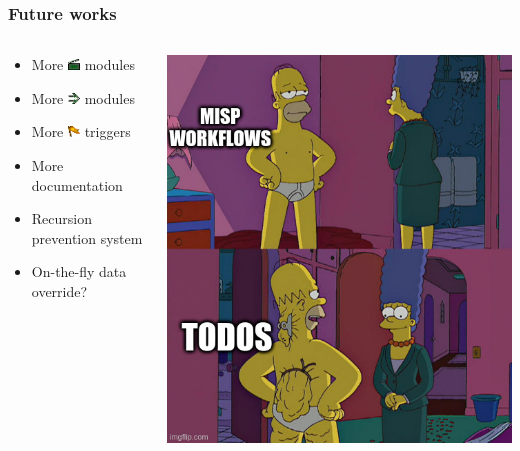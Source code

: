 \begin{frame}
    \frametitle{Future works}
    \begin{columns}
        \begin{column}{0.55\textwidth}
            \begin{itemize}
                \item More \includegraphics[width=12px]{pictures/sc-action-icon.png} modules
                \item More \includegraphics[width=12px]{pictures/sc-condition-icon.png} modules
                \item More \includegraphics[width=12px]{pictures/sc-event-icon.png} triggers
                \item More documentation
                \item Recursion prevention system
                \item On-the-fly data override?
            \end{itemize}
        \end{column}
        \begin{column}{0.45\textwidth}
            \includegraphics[width=1.0\linewidth]{pictures/future-works.jpeg}
        \end{column}
    \end{columns}
\end{frame}

